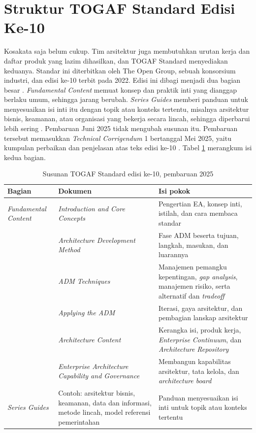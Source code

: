 \section{Struktur TOGAF Standard Edisi Ke-10}

Kosakata saja belum cukup. Tim arsitektur juga membutuhkan urutan kerja dan
daftar produk yang lazim dihasilkan, dan TOGAF Standard menyediakan keduanya.
Standar ini diterbitkan oleh The Open Group, sebuah konsorsium industri, dan
edisi ke-10 terbit pada 2022. Edisi ini dibagi menjadi dua bagian besar
\cite{togaf10}. \textit{Fundamental Content} memuat konsep dan praktik inti
yang dianggap berlaku umum, sehingga jarang berubah. \textit{Series Guides}
memberi panduan untuk menyesuaikan isi inti itu dengan topik atau konteks
tertentu, misalnya arsitektur bisnis, keamanan, atau organisasi yang bekerja
secara lincah, sehingga diperbarui lebih sering \cite{c02-togaf-pocket}.
Pembaruan Juni 2025 tidak mengubah susunan itu. Pembaruan tersebut memasukkan
\textit{Technical Corrigendum} 1 bertanggal Mei 2025, yaitu kumpulan
perbaikan dan penjelasan atas teks edisi ke-10 \cite{c02-togaf-pocket}.
Tabel \ref{tab:ch02-togaf-struktur} merangkum isi kedua bagian.

\begin{table}[!htb]
  \centering
  \caption{Susunan TOGAF Standard edisi ke-10, pembaruan 2025}
  \label{tab:ch02-togaf-struktur}
  {\footnotesize
  \begin{tabularx}{\textwidth}{>{\raggedright\arraybackslash}p{2.0cm}
                               >{\raggedright\arraybackslash}p{4.0cm}
                               >{\raggedright\arraybackslash}X}
    \hline
    \textbf{Bagian} & \textbf{Dokumen} & \textbf{Isi pokok} \\
    \hline
    \textit{Fundamental Content} & \textit{Introduction and Core Concepts} & Pengertian EA, konsep inti, istilah, dan cara membaca standar \\
    \hline
     & \textit{Architecture Development Method} & Fase ADM beserta tujuan, langkah, masukan, dan luarannya \\
    \hline
     & \textit{ADM Techniques} & Manajemen pemangku kepentingan, \textit{gap analysis}, manajemen risiko, serta alternatif dan \textit{tradeoff} \\
    \hline
     & \textit{Applying the ADM} & Iterasi, gaya arsitektur, dan pembagian lanskap arsitektur \\
    \hline
     & \textit{Architecture Content} & Kerangka isi, produk kerja, \textit{Enterprise Continuum}, dan \textit{Architecture Repository} \\
    \hline
     & \textit{Enterprise Architecture Capability and Governance} & Membangun kapabilitas arsitektur, tata kelola, dan \textit{architecture board} \\
    \hline
    \textit{Series Guides} & Contoh: arsitektur bisnis, keamanan, data dan informasi, metode lincah, model referensi pemerintahan & Panduan menyesuaikan isi inti untuk topik atau konteks tertentu \\
    \hline
  \end{tabularx}}
\end{table}

